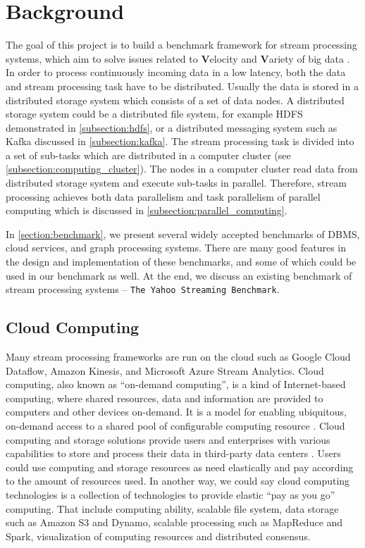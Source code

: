 \chapter{Background}
\label{chapter:background}
The goal of this project is to build a benchmark framework for stream processing systems, which aim to solve issues related to \textbf{V}elocity and \textbf{V}ariety of big data \cite{GameChanger}. In order to process continuously incoming data in a low latency, both the data and stream processing task have to be distributed. Usually the data is stored in a distributed storage system which consists of a set of data nodes. A distributed storage system could be a distributed file system, for example HDFS demonstrated in \cref{subsection:hdfs}, or a distributed messaging system such as Kafka discussed in \cref{subsection:kafka}. The stream processing task is divided into a set of sub-tasks which are distributed in a computer cluster (see \cref{subsection:computing_cluster}). The nodes in a computer cluster read data from distributed storage system and execute sub-tasks in parallel. Therefore, stream processing achieves both data parallelism and task parallelism of parallel computing which is discussed in \cref{subsection:parallel_computing}.
 
In \cref{section:benchmark}, we present several widely accepted benchmarks of DBMS, cloud services, and graph processing systems. There are many good features in the design and implementation of these benchmarks, and some of which could be used in our benchmark as well. At the end, we discuss an existing benchmark of stream processing systems -- \texttt{The Yahoo Streaming Benchmark}. 
 

\section{Cloud Computing}
Many stream processing frameworks are run on the cloud such as Google Cloud Dataflow, Amazon Kinesis, and Microsoft Azure Stream Analytics. Cloud computing, also known as ``on-demand computing'', is a kind of Internet-based computing, where shared resources, data and information are provided to computers and other devices on-demand. It is a model for enabling ubiquitous, on-demand access to a shared pool of configurable computing resource \cite{neto2011demystifying, mell2011nist}. Cloud computing and storage solutions provide users and enterprises with various capabilities to store and process their data in third-party data centers \cite{haghighat2015cloudid}. Users could use computing and storage resources as need elastically and pay according to the amount of resources used. In another way, we could say cloud computing technologies is a collection of technologies to provide elastic ``pay as you go'' computing. That include computing ability, scalable file system, data storage such as Amazon S3 and Dynamo, scalable processing such as MapReduce and Spark, visualization of computing resources and distributed consensus. 

